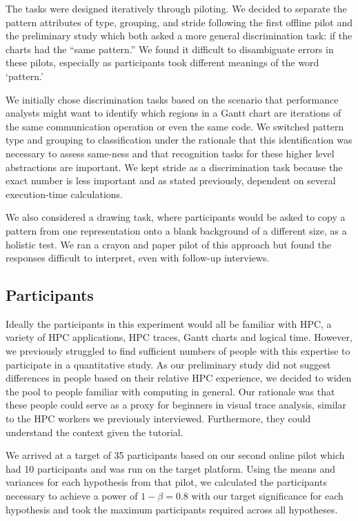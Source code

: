     The tasks were designed iteratively through piloting. We decided to separate the pattern attributes of type, grouping, and stride following the first offline pilot and the preliminary study which both asked a more general discrimination task: if the charts had the ``same pattern.'' We found it difficult to disambiguate errors in these pilots, especially as participants took different meanings of the word `pattern.'
    
    We initially chose discrimination tasks based on the scenario that performance analysts might want to identify which regions in a Gantt chart are iterations of the same communication operation or even the same code. We switched pattern type and grouping to classification under the rationale that this identification was necessary to assess same-ness and that recognition tasks for these higher level abstractions are important. We kept stride as a discrimination task because the exact number is less important and as stated previously, dependent on several execution-time calculations.
    
    We also considered a drawing task, where participants would be asked to copy a pattern from one representation onto a blank background of a different size, as a holistic test. We ran a crayon and paper pilot of this approach but found the responses difficult to interpret, even with follow-up interviews.
    
    

\subsection{Participants}
    Ideally the participants in this experiment would all be familiar with HPC, a variety of HPC applications, HPC traces, Gantt charts and logical time. However, we previously struggled to find sufficient numbers of people with this expertise to participate in a quantitative study. As our preliminary study did not suggest differences in people based on their relative HPC experience, we decided to widen the pool to people familiar with computing in general. Our rationale was that these people could serve as a proxy for beginners in visual trace analysis, similar to the HPC workers we previously interviewed. Furthermore, they could understand the context given the tutorial.
    
    We arrived at a target of 35 participants based on our second online pilot which had 10 participants and was run on the target platform. Using the means and variances for each hypothesis from that pilot, we calculated the participants necessary to achieve a power of $1 - \beta=0.8$ with our target significance for each hypothesis and took the maximum participants required across all hypotheses.

